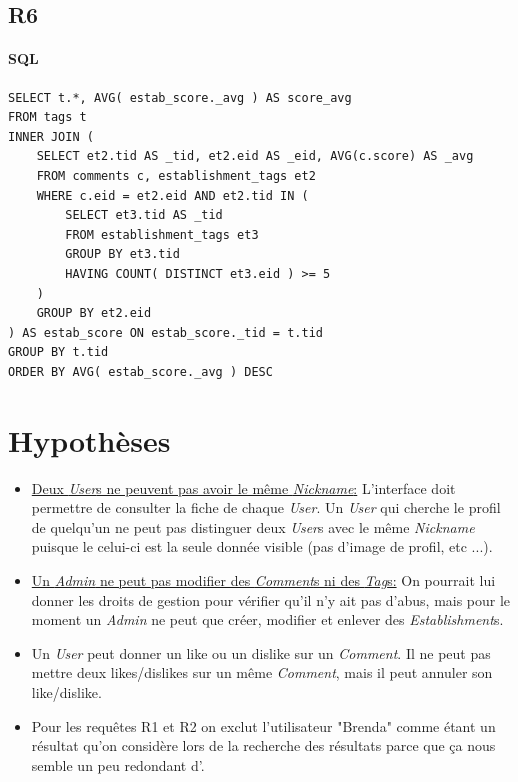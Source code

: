\documentclass[11pt,a4paper]{report}
\begin{document}
\subsection*{R6}


\paragraph*{SQL}
\begin{verbatim}
SELECT t.*, AVG( estab_score._avg ) AS score_avg
FROM tags t
INNER JOIN (
    SELECT et2.tid AS _tid, et2.eid AS _eid, AVG(c.score) AS _avg
    FROM comments c, establishment_tags et2
    WHERE c.eid = et2.eid AND et2.tid IN (
        SELECT et3.tid AS _tid
        FROM establishment_tags et3
        GROUP BY et3.tid
        HAVING COUNT( DISTINCT et3.eid ) >= 5
    )
    GROUP BY et2.eid
) AS estab_score ON estab_score._tid = t.tid
GROUP BY t.tid 
ORDER BY AVG( estab_score._avg ) DESC
\end{verbatim}

\section*{Hypothèses}
\noindent

\begin{itemize}
\item \underline{Deux \textit{User}s ne peuvent pas avoir le même \textit{Nickname}:} L'interface doit permettre de consulter la fiche de chaque \textit{User}. Un \textit{User} qui cherche le profil de quelqu'un ne peut pas distinguer deux \textit{User}s avec le même \textit{Nickname} puisque le celui-ci est la seule donnée visible (pas d'image de profil, etc ...).
\item \underline{Un \textit{Admin} ne peut pas modifier des \textit{Comment}s ni des \textit{Tag}s:} On pourrait lui donner les droits de gestion pour vérifier qu'il n'y ait pas d'abus, mais pour le moment un \textit{Admin} ne peut que créer, modifier et enlever des \textit{Establishment}s.
\item Un \textit{User} peut donner un like ou un dislike sur un \textit{Comment}. Il ne peut pas mettre deux likes/dislikes sur un même \textit{Comment}, mais il peut annuler son like/dislike.
\item Pour les requêtes R1 et R2 on exclut l'utilisateur "Brenda" comme étant un résultat qu'on considère lors de la recherche des résultats parce que ça nous semble un peu redondant d'.
\end{itemize}
\end{document}
